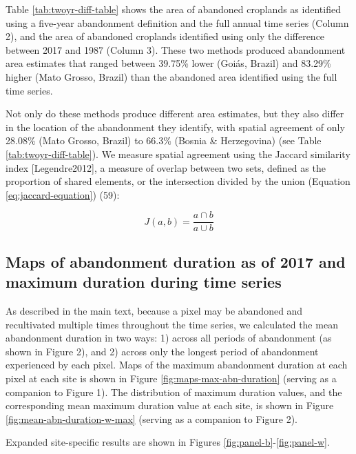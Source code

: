 \documentclass[9pt,twocolumn,twoside,lineno]{pnas-new}
\begin{document}
Table \ref{tab:twoyr-diff-table} shows the area of abandoned croplands as identified using a five-year abandonment definition and the full annual time series (Column 2), and the area of abandoned croplands identified using only the difference between 2017 and 1987 (Column 3).
These two methods produced abandonment area estimates that ranged between 39.75\% lower (Goiás, Brazil) and 83.29\% higher (Mato Grosso, Brazil) than the abandoned area identified using the full time series.

Not only do these methods produce different area estimates, but they also differ in the location of the abandonment they identify, with spatial agreement of only 28.08\% (Mato Grosso, Brazil) to 66.3\% (Bosnia \& Herzegovina) (see Table \ref{tab:twoyr-diff-table}).
We measure spatial agreement using the Jaccard similarity index {[}Legendre2012{]}, a measure of overlap between two sets, defined as the proportion of shared elements, or the intersection divided by the union (Equation \eqref{eq:jaccard-equation}) (59):

\begin{equation}
J(a,b) = \frac{a\cap b}{a\cup b} \label{eq:jaccard-equation}
\end{equation}

\hypertarget{maps-of-abandonment-duration-as-of-2017-and-maximum-duration-during-time-series}{%
\subsection{Maps of abandonment duration as of 2017 and maximum duration during time series}\label{maps-of-abandonment-duration-as-of-2017-and-maximum-duration-during-time-series}}

As described in the main text, because a pixel may be abandoned and recultivated multiple times throughout the time series, we calculated the mean abandonment duration in two ways: 1) across all periods of abandonment (as shown in Figure 2), and 2) across only the longest period of abandonment experienced by each pixel.
Maps of the maximum abandonment duration at each pixel at each site is shown in Figure \ref{fig:maps-max-abn-duration} (serving as a companion to Figure 1).
The distribution of maximum duration values, and the corresponding mean maximum duration value at each site, is shown in Figure \ref{fig:mean-abn-duration-w-max} (serving as a companion to Figure 2).

Expanded site-specific results are shown in Figures \ref{fig:panel-b}-\ref{fig:panel-w}.
\end{document}
